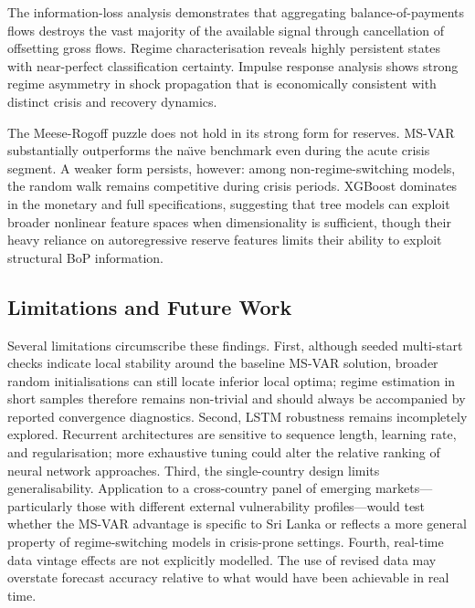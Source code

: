 \documentclass[12pt,a4paper]{article}
\begin{document}
The information-loss analysis demonstrates that aggregating balance-of-payments flows destroys the vast majority of the available signal through cancellation of offsetting gross flows. Regime characterisation reveals highly persistent states with near-perfect classification certainty. Impulse response analysis shows strong regime asymmetry in shock propagation that is economically consistent with distinct crisis and recovery dynamics.

The Meese-Rogoff puzzle does not hold in its strong form for reserves. MS-VAR substantially outperforms the na\"{\i}ve benchmark even during the acute crisis segment. A weaker form persists, however: among non-regime-switching models, the random walk remains competitive during crisis periods. XGBoost dominates in the monetary and full specifications, suggesting that tree models can exploit broader nonlinear feature spaces when dimensionality is sufficient, though their heavy reliance on autoregressive reserve features limits their ability to exploit structural BoP information.

\subsection{Limitations and Future Work}

Several limitations circumscribe these findings. First, although seeded multi-start checks indicate local stability around the baseline MS-VAR solution, broader random initialisations can still locate inferior local optima; regime estimation in short samples therefore remains non-trivial and should always be accompanied by reported convergence diagnostics. Second, LSTM robustness remains incompletely explored. Recurrent architectures are sensitive to sequence length, learning rate, and regularisation; more exhaustive tuning could alter the relative ranking of neural network approaches. Third, the single-country design limits generalisability. Application to a cross-country panel of emerging markets---particularly those with different external vulnerability profiles---would test whether the MS-VAR advantage is specific to Sri Lanka or reflects a more general property of regime-switching models in crisis-prone settings. Fourth, real-time data vintage effects are not explicitly modelled. The use of revised data may overstate forecast accuracy relative to what would have been achievable in real time.
\end{document}
